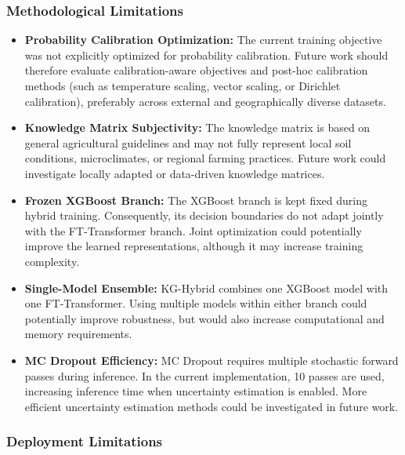 \documentclass[journal]{IEEEtran}
\begin{document}
\subsubsection{Methodological Limitations}

\begin{itemize}[leftmargin=1.2em]
    \item \textbf{Probability Calibration Optimization:} The current training objective was not explicitly optimized for probability calibration. Future work should therefore evaluate calibration-aware objectives and post-hoc calibration methods (such as temperature scaling, vector scaling, or Dirichlet calibration), preferably across external and geographically diverse datasets.
    \item \textbf{Knowledge Matrix Subjectivity:} The knowledge matrix is based on general agricultural guidelines and may not fully represent local soil conditions, microclimates, or regional farming practices. Future work could investigate locally adapted or data-driven knowledge matrices.

    \item \textbf{Frozen XGBoost Branch:} The XGBoost branch is kept fixed during hybrid training. Consequently, its decision boundaries do not adapt jointly with the FT-Transformer branch. Joint optimization could potentially improve the learned representations, although it may increase training complexity.

    \item \textbf{Single-Model Ensemble:} KG-Hybrid combines one XGBoost model with one FT-Transformer. Using multiple models within either branch could potentially improve robustness, but would also increase computational and memory requirements.

    \item \textbf{MC Dropout Efficiency:} MC Dropout requires multiple stochastic forward passes during inference. In the current implementation, 10 passes are used, increasing inference time when uncertainty estimation is enabled. More efficient uncertainty estimation methods could be investigated in future work.
\end{itemize}


\subsubsection{Deployment Limitations}
\end{document}
